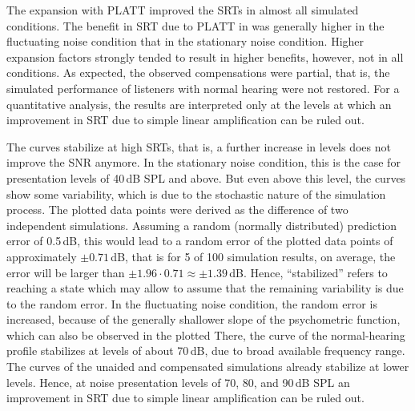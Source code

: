 \documentclass[10pt,a4paper,twocolumn]{article}
\begin{document}
The expansion with PLATT improved the SRTs in almost all simulated conditions.
%
The benefit in SRT due to PLATT in was generally higher in the fluctuating noise condition that in the stationary noise condition.
%
Higher expansion factors strongly tended to result in higher benefits, however, not in all conditions.
%
As expected, the observed compensations were partial, that is, the simulated performance of listeners with normal hearing were not restored.
%
For a quantitative analysis, the results are interpreted only at the levels at which an improvement in SRT due to simple linear amplification can be ruled out.

The curves stabilize at high SRTs, that is, a further increase in levels does not improve the SNR anymore.
%
In the stationary noise condition, this is the case for presentation levels of 40\,dB SPL and above.
%
But even above this level, the curves show some variability, which is due to the stochastic nature of the simulation process.
%
The plotted data points were derived as the difference of two independent simulations.
%
Assuming a random (normally distributed) prediction error of 0.5\,dB, this would lead to a random error of the plotted data points of approximately $\pm0.71$\,dB, that is for 5 of 100 simulation results, on average, the error will be larger than $\pm1.96\cdot0.71\approx\pm1.39$\,dB.
%
Hence, \enquote{stabilized} refers to reaching a state which may allow to assume that the remaining variability is due to the random error.
%
In the fluctuating noise condition, the random error is increased, because of the generally shallower slope of the psychometric function, which can also be observed in the plotted 
%
There, the curve of the normal-hearing profile stabilizes at levels of about 70\,dB, due to broad available frequency range.
%
The curves of the unaided and compensated simulations already stabilize at lower levels.
%
Hence, at noise presentation levels of 70, 80, and 90\,dB SPL an improvement in SRT due to simple linear amplification can be ruled out.
\end{document}
